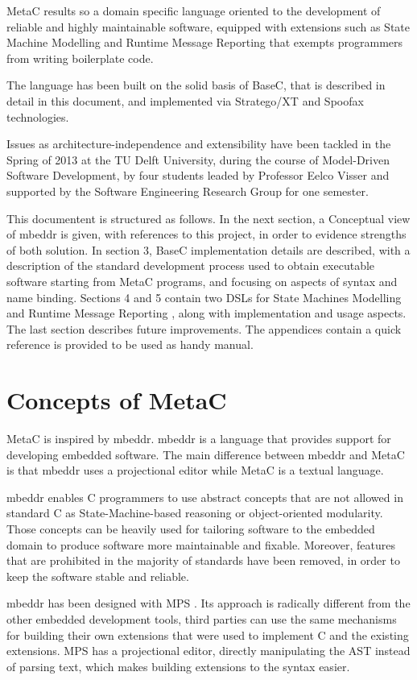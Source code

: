 \documentclass[a4paper,10pt,titlepage]{report}
\begin{document}
MetaC results so a domain specific language oriented to the development of reliable and highly maintainable software, equipped with extensions such as State Machine Modelling and Runtime Message Reporting that exempts programmers from writing boilerplate code.

The language has been built on the solid basis of BaseC, that is described in detail in this document, and implemented via Stratego/XT \cite{visser2004program} and Spoofax \cite{kalleberg2007spoofax} technologies. 

Issues as architecture-independence and extensibility have been tackled in the Spring of 2013 at the TU Delft University, during the course of Model-Driven Software Development, by four students leaded by Professor Eelco Visser and supported by the Software Engineering Research Group for one semester.

This documentent is structured as follows. In the next section, a Conceptual view of mbeddr is given, with references to this project, in order to evidence strengths of both solution. In section 3, BaseC implementation details are described, with a description of the standard development process used to obtain executable software starting from MetaC programs, and focusing on aspects of syntax and name binding. Sections 4 and 5 contain two DSLs for State Machines Modelling and Runtime Message Reporting , along with implementation and usage aspects. The last section describes future improvements. The appendices contain a quick reference is provided to be used as handy manual.

\chapter{Concepts of MetaC}

MetaC is inspired by mbeddr. mbeddr is a language that provides support for developing embedded software. The main difference between mbeddr and MetaC is that mbeddr uses a projectional editor while MetaC is a textual language.

mbeddr enables C programmers to use abstract concepts that are not allowed in standard C as State-Machine-based reasoning or object-oriented modularity. Those concepts can be heavily used for tailoring software to the embedded domain to produce software more maintainable and fixable. Moreover, features that are prohibited in the majority of standards have been removed, in order to keep the software stable and reliable.

mbeddr has been designed with MPS \cite{voelter2010language}. Its approach is radically different from the other embedded development tools, third parties can use the same mechanisms for building their own extensions that were used to implement C and the existing extensions. MPS has a projectional editor, directly manipulating the AST instead of parsing text, which makes building extensions to the syntax easier. 
\end{document}

